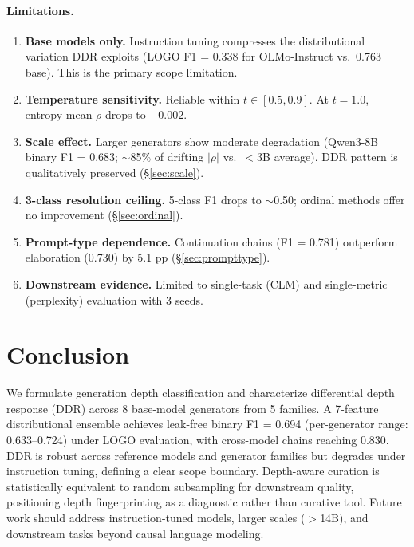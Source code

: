 \documentclass[11pt,twocolumn]{article}
\begin{document}
\paragraph{Limitations.}
\begin{enumerate}[nosep,leftmargin=*]
\item \textbf{Base models only.} Instruction tuning compresses the distributional variation DDR exploits (LOGO F1 = 0.338 for OLMo-Instruct vs.\ 0.763 base). This is the primary scope limitation.
\item \textbf{Temperature sensitivity.} Reliable within $t \in [0.5, 0.9]$. At $t = 1.0$, entropy mean $\rho$ drops to $-0.002$.
\item \textbf{Scale effect.} Larger generators show moderate degradation (Qwen3-8B binary F1 = 0.683; $\sim$85\% of drifting $|\rho|$ vs.\ $<$3B average). DDR pattern is qualitatively preserved (\S\ref{sec:scale}).
\item \textbf{3-class resolution ceiling.} 5-class F1 drops to $\sim$0.50; ordinal methods offer no improvement (\S\ref{sec:ordinal}).
\item \textbf{Prompt-type dependence.} Continuation chains (F1 = 0.781) outperform elaboration (0.730) by 5.1 pp (\S\ref{sec:prompttype}).
\item \textbf{Downstream evidence.} Limited to single-task (CLM) and single-metric (perplexity) evaluation with 3 seeds.
\end{enumerate}

\section{Conclusion}

We formulate generation depth classification and characterize differential depth response (DDR) across 8 base-model generators from 5 families.
A 7-feature distributional ensemble achieves leak-free binary F1 = 0.694 (per-generator range: 0.633--0.724) under LOGO evaluation, with cross-model chains reaching 0.830.
DDR is robust across reference models and generator families but degrades under instruction tuning, defining a clear scope boundary.
Depth-aware curation is statistically equivalent to random subsampling for downstream quality, positioning depth fingerprinting as a diagnostic rather than curative tool.
Future work should address instruction-tuned models, larger scales ($>$14B), and downstream tasks beyond causal language modeling.
\end{document}
